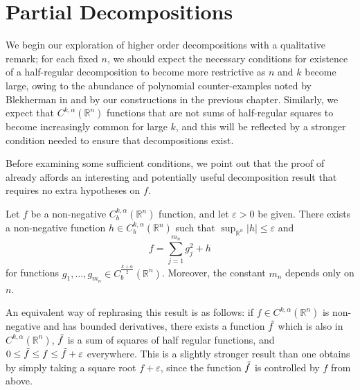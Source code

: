 \documentclass[oneside,hidelinks,indentfirst,10pt]{book}
\begin{document}
\section{Partial Decompositions}


We begin our exploration of higher order decompositions with a qualitative remark; for each fixed \(n\), we should expect the necessary conditions for existence of a half-regular decomposition to become more restrictive as \(n\) and \(k\) become large, owing to the abundance of polynomial counter-examples noted by Blekherman in \cite{Blekherman} and by our constructions in the previous chapter. Similarly, we expect that \(C^{k,\alpha}(\mathbb{R}^n)\) functions that are not sums of half-regular squares to become increasingly common for large \(k\), and this will be reflected by a stronger condition needed to ensure that decompositions exist. 


Before examining some sufficient conditions, we point out that the proof of  already affords an interesting and potentially useful decomposition result that requires no extra hypotheses on \(f\).

\newpage


\begin{thm}\label{thm:almostthere}
Let \(f\) be a non-negative \(C^{k,\alpha}_b(\mathbb{R}^n)\) function, and let \(\varepsilon>0\) be given. There exists a non-negative function \(h\in C_b^{k,\alpha}(\mathbb{R}^n)\) such that \(\sup_{\mathbb{R}^n}|h|\leq\varepsilon\) and 
\[
    f=\sum_{j=1}^{m_n}g_j^2+h
\]
for functions \(g_1,\dots,g_{m_n}\in C_b^\frac{k+\alpha}{2}(\mathbb{R}^n)\). Moreover, the constant \(m_n\) depends only on \(n\).
\end{thm}


An equivalent way of rephrasing this result is as follows: if \(f\in C^{k,\alpha}(\mathbb{R}^n)\) is non-negative and has  bounded derivatives, there exists a function \(\Tilde{f}\) which is also in \(C^{k,\alpha}(\mathbb{R}^n)\), \(\Tilde{f}\) is a sum of squares of half regular functions, and \(0\leq \Tilde{f}\leq f\leq \Tilde{f}+\varepsilon\) everywhere. This is a slightly stronger result than one obtains by simply taking a square root \(f+\varepsilon\), since the function \(\Tilde{f}\) is controlled by \(f\) from above. 

\end{document}
